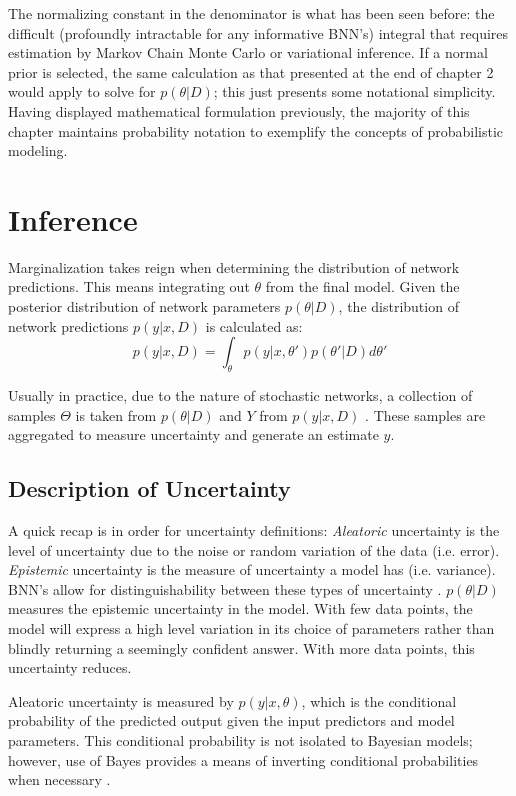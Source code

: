 The normalizing constant in the denominator is what has been seen before: the difficult (profoundly intractable for any informative BNN's) integral that requires estimation by Markov Chain Monte Carlo or variational inference.  If a normal prior is selected, the same calculation as that presented at the end of chapter 2 would apply to solve for $p(\theta|D)$; this just presents some notational simplicity.  Having displayed mathematical formulation previously, the majority of this chapter maintains probability notation to exemplify the concepts of probabilistic modeling.



\section{Inference}

Marginalization takes reign when determining the distribution of network predictions.  This means integrating out $\theta$ from the final model.  Given the posterior distribution of network parameters $p(\theta|D)$, the distribution of network predictions $p(y|x,D)$ is calculated as:
$$
p(y|x,D) = \int_\theta p(y|x,\theta')p(\theta'|D)d\theta'
$$

Usually in practice, due to the nature of stochastic networks, a collection of samples $\Theta$ is taken from $p(\theta|D)$ and $Y$ from $p(y|x,D)$ \cite{Jospin}. These samples are aggregated to measure uncertainty and generate an estimate $\hat{y}$.


\subsection{Description of Uncertainty}

A quick recap is in order for uncertainty definitions: \textit{Aleatoric} uncertainty is the level of uncertainty due to the noise or random variation of the data (i.e. error).  \textit{Epistemic} uncertainty is the measure of uncertainty a model has (i.e. variance).  BNN's allow for distinguishability between these types of uncertainty \cite{Jospin}.  $p(\theta|D)$ measures the epistemic uncertainty in the model.  With few data points, the model will express a high level variation in its choice of parameters rather than blindly returning a seemingly confident answer.  With more data points, this uncertainty reduces.

Aleatoric uncertainty is measured by $p(y|x,\theta)$, which is the conditional probability of the predicted output given the input predictors and model parameters.  This conditional probability is not isolated to Bayesian models; however, use of Bayes provides a means of inverting conditional probabilities when necessary \cite{Jospin}.


